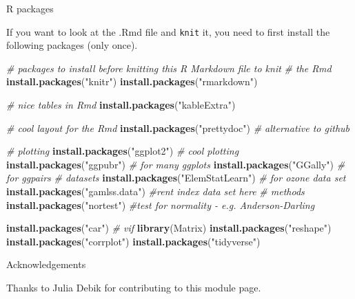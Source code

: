 \documentclass[ignorenonframetext,]{beamer}
\newenvironment{Shaded}{\begin{snugshade}}{\end{snugshade}}
\newcommand{\KeywordTok}[1]{\textcolor[rgb]{0.13,0.29,0.53}{\textbf{#1}}}
\newcommand{\StringTok}[1]{\textcolor[rgb]{0.31,0.60,0.02}{#1}}
\newcommand{\CommentTok}[1]{\textcolor[rgb]{0.56,0.35,0.01}{\textit{#1}}}
\newcommand{\NormalTok}[1]{#1}
\begin{document}
\begin{frame}[fragile]{ R packages}

If you want to look at the .Rmd file and \texttt{knit} it, you need to
first install the following packages (only once).

\begin{Shaded}
\begin{Highlighting}[]
\CommentTok{# packages to install before knitting this R Markdown file to knit}
\CommentTok{# the Rmd}
\KeywordTok{install.packages}\NormalTok{(}\StringTok{"knitr"}\NormalTok{)}
\KeywordTok{install.packages}\NormalTok{(}\StringTok{"rmarkdown"}\NormalTok{)}

\CommentTok{# nice tables in Rmd}
\KeywordTok{install.packages}\NormalTok{(}\StringTok{"kableExtra"}\NormalTok{)}

\CommentTok{# cool layout for the Rmd}
\KeywordTok{install.packages}\NormalTok{(}\StringTok{"prettydoc"}\NormalTok{)  }\CommentTok{# alternative to github}

\CommentTok{# plotting}
\KeywordTok{install.packages}\NormalTok{(}\StringTok{"ggplot2"}\NormalTok{)  }\CommentTok{# cool plotting}
\KeywordTok{install.packages}\NormalTok{(}\StringTok{"ggpubr"}\NormalTok{)  }\CommentTok{# for many ggplots}
\KeywordTok{install.packages}\NormalTok{(}\StringTok{"GGally"}\NormalTok{)  }\CommentTok{# for ggpairs}
\CommentTok{# datasets}
\KeywordTok{install.packages}\NormalTok{(}\StringTok{"ElemStatLearn"}\NormalTok{)  }\CommentTok{# for ozone data set}
\KeywordTok{install.packages}\NormalTok{(}\StringTok{"gamlss.data"}\NormalTok{)  }\CommentTok{#rent index data set here}
\CommentTok{# methods}
\KeywordTok{install.packages}\NormalTok{(}\StringTok{"nortest"}\NormalTok{)  }\CommentTok{#test for normality - e.g. Anderson-Darling}

\KeywordTok{install.packages}\NormalTok{(}\StringTok{"car"}\NormalTok{)  }\CommentTok{# vif}
\KeywordTok{library}\NormalTok{(Matrix)}
\KeywordTok{install.packages}\NormalTok{(}\StringTok{"reshape"}\NormalTok{)}
\KeywordTok{install.packages}\NormalTok{(}\StringTok{"corrplot"}\NormalTok{)}
\KeywordTok{install.packages}\NormalTok{(}\StringTok{"tidyverse"}\NormalTok{)}
\end{Highlighting}
\end{Shaded}

\end{frame}

\begin{frame}{Acknowledgements}

Thanks to Julia Debik for contributing to this module page.

\end{frame}
\end{document}
